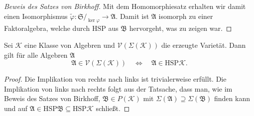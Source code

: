 \begin{proof}[Beweis des Satzes von Birkhoff]
    Mit dem Homomorphiesatz erhalten wir damit einen Isomorphismus $\tilde{\varphi} : \mathfrak{S} /_{\ker \varphi} \to \mathfrak{A}$. Damit ist $\mathfrak{A}$ isomorph zu einer Faktoralgebra, welche durch $\mathrm{HSP}$ aus $\mathfrak{B}$ hervorgeht, was zu zeigen war.
\end{proof}

\begin{corollary}
    Sei $\mathcal{K}$ eine Klasse von Algebren und $\mathcal{V}(\Sigma(\mathcal{K}))$ die erzeugte Varietät. Dann gilt für alle Algebren $\mathfrak{A}$
    $$ \mathfrak{A} \in \mathcal{V}(\Sigma(\mathcal{K})) \quad \Leftrightarrow \quad \mathfrak{A} \in \mathrm{HSP}\mathcal{K}. $$
\end{corollary}

\begin{proof}
    Die Implikation von rechts nach links ist trivialerweise erfüllt. Die Implikation von links nach rechts folgt aus der Tatsache, dass man, wie im Beweis des Satzes von Birkhoff, $\mathfrak{B}\in P(\mathcal{K})$ mit $\Sigma(\mathfrak{A})\supseteq\Sigma(\mathfrak{B})$ finden kann und auf $\mathfrak{A}\in \mathrm{HSP}\mathfrak{B}\subseteq \mathrm{HSP}\mathcal{K}$ schließt.
\end{proof}